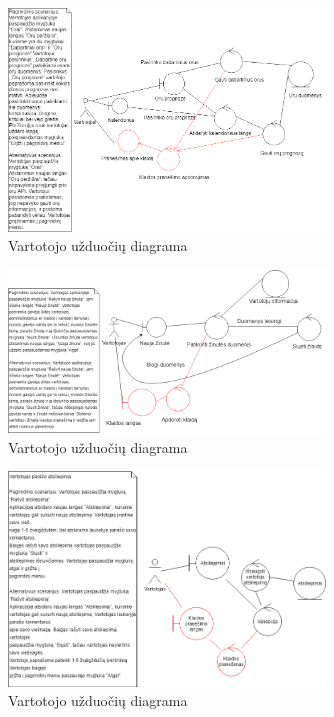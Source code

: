 \documentclass[oneside]{VUMIFPSkursinis}
\begin{document}
			\begin{figure}[h]
    				\centering
    				\includegraphics[width=0.75\textwidth]{rob10.png}
    				\caption{Vartotojo užduočių diagrama}
    				\label{fig:VartotojoUseCasel}
			\end{figure}

			\begin{figure}[h]
    				\centering
    				\includegraphics[width=0.75\textwidth]{rob11.png}
    				\caption{Vartotojo užduočių diagrama}
    				\label{fig:VartotojoUseCasel}
			\end{figure}

			\begin{figure}[h]
    				\centering
    				\includegraphics[width=0.75\textwidth]{rob12.png}
    				\caption{Vartotojo užduočių diagrama}
    				\label{fig:VartotojoUseCasel}
			\end{figure}
\end{document}
